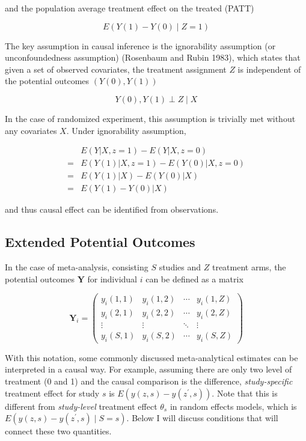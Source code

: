 \noindent and the population average treatment effect on the treated
(PATT)

\begin{equation*}
    E(Y(1)-Y(0)\mid Z=1)
\end{equation*}

\noindent The key assumption in causal inference is the ignorability
assumption (or unconfoundedness assumption) (Rosenbaum and Rubin 1983),
which states that given a set of observed covariates, the treatment
assignment \(Z\) is independent of the potential outcomes
\((Y(0), Y(1))\)

\begin{equation*}
    Y(0),Y(1) \perp Z \mid X
\end{equation*}

\noindent In the case of randomized experiment, this assumption is
trivially met without any covariates \(X\). Under ignorability
assumption,

\begin{align*}
     &E(Y|X, z=1)-E(Y|X, z=0)\\
    =&E(Y(1)|X, z=1)-E(Y(0)|X, z=0)\\
    =&E(Y(1)|X)-E(Y(0)|X)\\
    =&E(Y(1)-Y(0)|X)
\end{align*}

\noindent and thus causal effect can be identified from observations.

\subsection{Extended Potential
Outcomes}\label{extended-potential-outcomes}

In the case of meta-analysis, consisting \(S\) studies and \(Z\)
treatment arms, the potential outcomes \(\bm Y\) for individual \(i\)
can be defined as a matrix

\begin{equation*}
\bm Y_i=
\begin{pmatrix}
y_i(1,1) & y_i(1,2) & \cdots & y_i(1,Z)\\
y_i(2,1) & y_i(2,2) & \cdots & y_i(2,Z)\\
\vdots & \vdots & \ddots & \vdots\\
y_i(S,1) & y_i(S,2) & \cdots & y_i(S,Z)
\end{pmatrix}
\end{equation*}

\noindent With this notation, some commonly discussed meta-analytical
estimates can be interpreted in a causal way. For example, assuming
there are only two level of treatment (0 and 1) and the causal
comparison is the difference, \emph{study-specific} treatment effect for
study \(s\) is \(E(y(z,s)-y(z^\prime, s))\). Note that this is different
from \emph{study-level} treatment effect \(\theta_s\) in random effects
models, which is \(E(y(z,s)-y(z^\prime, s)\mid S=s)\). Below I will
discuss conditions that will connect these two quantities.

